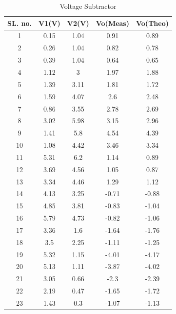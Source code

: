 \documentclass[10pt]{scrartcl}
\theoremstyle{definition}
\begin{document}
\begin{table}[!ht]
    \centering
    \begin{tabular}{|c|c|c|c|c|}
    \hline
        \textbf{SL. no.} & \textbf{V1(V)} & \textbf{V2(V)} & \textbf{Vo(Meas)} & \textbf{Vo(Theo)} \\ \hline
        1 & 0.15 & 1.04 & 0.91 & 0.89 \\ \hline
        2 & 0.26 & 1.04 & 0.82 & 0.78 \\ \hline
        3 & 0.39 & 1.04 & 0.64 & 0.65 \\ \hline
        4 & 1.12 & 3 & 1.97 & 1.88 \\ \hline
        5 & 1.39 & 3.11 & 1.81 & 1.72 \\ \hline
        6 & 1.59 & 4.07 & 2.6 & 2.48 \\ \hline
        7 & 0.86 & 3.55 & 2.78 & 2.69 \\ \hline
        8 & 3.02 & 5.98 & 3.15 & 2.96 \\ \hline
        9 & 1.41 & 5.8 & 4.54 & 4.39 \\ \hline
        10 & 1.08 & 4.42 & 3.46 & 3.34 \\ \hline
        11 & 5.31 & 6.2 & 1.14 & 0.89 \\ \hline
        12 & 3.69 & 4.56 & 1.05 & 0.87 \\ \hline
        13 & 3.34 & 4.46 & 1.29 & 1.12 \\ \hline
        14 & 4.13 & 3.25 & -0.71 & -0.88 \\ \hline
        15 & 4.85 & 3.81 & -0.83 & -1.04 \\ \hline
        16 & 5.79 & 4.73 & -0.82 & -1.06 \\ \hline
        17 & 3.36 & 1.6 & -1.64 & -1.76 \\ \hline
        18 & 3.5 & 2.25 & -1.11 & -1.25 \\ \hline
        19 & 5.32 & 1.15 & -4.01 & -4.17 \\ \hline
        20 & 5.13 & 1.11 & -3.87 & -4.02 \\ \hline
        21 & 3.05 & 0.66 & -2.3 & -2.39 \\ \hline
        22 & 2.19 & 0.47 & -1.65 & -1.72 \\ \hline
        23 & 1.43 & 0.3 & -1.07 & -1.13 \\ \hline
    \end{tabular}
    \caption{Voltage Subtractor}
\end{table}
\end{document}

